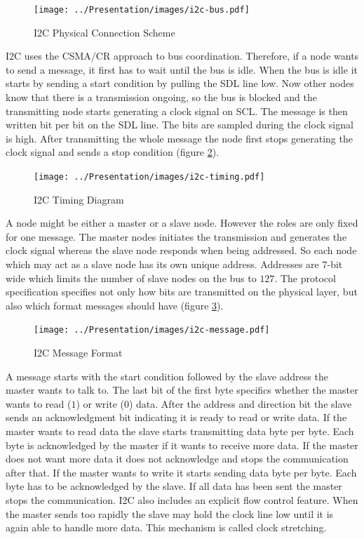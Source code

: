 \documentclass[pdftex,12pt,a4paper,fleqn]{scrartcl}
\begin{document}
\begin{figure}[h]	
	\centering
  \texttt{[image: ../Presentation/images/i2c-bus.pdf]}
  \caption{I2C Physical Connection Scheme}
  \label{fig:i2c_physical}
\end{figure}

I2C uses the CSMA/CR approach to bus coordination. Therefore, if a node wants to send a message, it first has to wait until the bus is idle. When the bus is idle it starts by sending a start condition by pulling the SDL line low. Now other nodes know that there is a transmission ongoing, so the bus is blocked and the transmitting node starts generating a clock signal on SCL. The message is then written bit per bit on the SDL line. The bits are sampled during the clock signal is high. After transmitting the whole message the node first stops generating the clock signal and sends a stop condition (figure \ref{fig:i2c_timing}).

\begin{figure}[H]	
	\centering
  \texttt{[image: ../Presentation/images/i2c-timing.pdf]}
  \caption{I2C Timing Diagram}
  \label{fig:i2c_timing}
\end{figure}

A node might be either a master or a slave node. However the roles are only fixed for one message. The master nodes initiates the transmission and generates the clock signal whereas the slave node responds when being addressed. So each node which may act as a slave node has its own unique address. Addresses are $7$-bit wide which limits the number of slave nodes on the bus to $127$. The protocol specification specifies not only how bits are transmitted on the physical layer, but also which format messages should have (figure \ref{fig:i2c_msg}).

\begin{figure}[h]	
	\centering
  \texttt{[image: ../Presentation/images/i2c-message.pdf]}
  \caption{I2C Message Format}
  \label{fig:i2c_msg}
\end{figure}

A message starts with the start condition followed by the slave address the master wants to talk to. The last bit of the first byte specifics whether the master wants to read ($1$) or write ($0$) data. After the address and direction bit the slave sends an acknowledgment bit indicating it is ready to read or write data. If the master wants to read data the slave starts transmitting data byte per byte. Each byte is acknowledged by the master if it wants to receive more data. If the master does not want more data it does not acknowledge and stops the communication after that. If the master wants to write it starts sending data byte per byte. Each byte has to be acknowledged by the slave. If all data has been sent the master stops the communication. I2C also includes an explicit flow control feature. When the master sends too rapidly the slave may hold the clock line low until it is again able to handle more data. This mechanism is called clock stretching.
\end{document}
